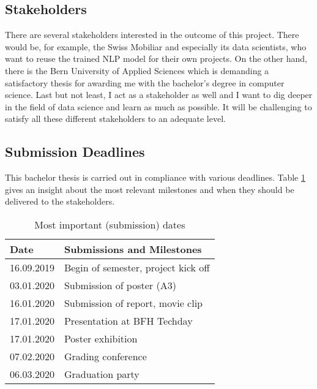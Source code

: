 \subsection{Stakeholders}

There are several stakeholders interested in the outcome of this project. There would be, for example, the Swiss Mobiliar and
especially its data scientists, who want to reuse the trained NLP model for their own projects. On the other hand, there is
the Bern University of Applied Sciences which is demanding a satisfactory thesis for awarding me with the bachelor's degree
in computer science. Last but not least, I act as a stakeholder as well and I want to dig deeper in the field of data science and
learn as much as possible. It will be challenging to satisfy all these different stakeholders to an adequate level.

\subsection{Submission Deadlines}

This bachelor thesis is carried out in compliance with various deadlines. Table \ref{tbl:deadlines} gives an insight about the most
relevant milestones and when they should be delivered to the stakeholders.

\begin{table}[ht!]
    \centering
    \begin{tabular}{|l|l|}
        \hline
        \textbf{Date} & \textbf{Submissions and Milestones} \\ [0.5ex]
        \hline
        16.09.2019 & Begin of semester, project kick off \\
        03.01.2020 & Submission of poster (A3) \\
        16.01.2020 & Submission of report, movie clip \\
        17.01.2020 & Presentation at BFH Techday \\
        17.01.2020 & Poster exhibition \\
        07.02.2020 & Grading conference \\
        06.03.2020 & Graduation party \\ [1ex]
        \hline
    \end{tabular}
    \caption{Most important (submission) dates}
    \label{tbl:deadlines}
\end{table}

